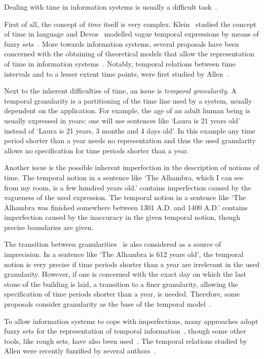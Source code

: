 Dealing with time in information systems is usually a difficult task~\cite{Bolour82}.

First of all, the concept of \emph{time} itself is very complex. Klein~\cite{klein94} studied the concept of time in language and Devos~\cite{devos94} modelled vague temporal expressions by means of fuzzy sets~\cite{zadeh65}. More towards information systems, several proposals have been concerned with the obtaining of theoretical models that allow the representation of time in information systems~\cite{devos98,Cru97}. Notably, temporal relations between time intervals and to a lesser extent time points, were first studied by Allen~\cite{Allen83}.

Next to the inherent difficulties of time, an issue is \emph{temporal granularity}. A temporal granularity is a partitioning of the time line used by a system, usually dependent on the application. For example, the age of an adult human being is usually expressed in years: one will use sentences like `Laura is 21 years old' instead of `Laura is 21 years, 3 months and 4 days old'. In this example any time period shorter than a year needs no representation and thus the used granularity allows no specification for time periods shorter than a year.

Another issue is the possible inherent imperfection in the description of notions of time. The temporal notion in a sentence like `The Alhambra, which I can see from my room, is a few hundred years old.' contains imperfection caused by the vagueness of the used expression. The temporal notion in a sentence like `The Alhambra was finished somewhere between 1301 A.D. and 1400 A.D.' contains imperfection caused by the inaccuracy in the given temporal notion, though precise boundaries are given.

The transition between granularities~\cite{Lin97} is also considered as a source of imprecision. In a sentence like `The Alhambra is 612 years old', the temporal notion is very precise if time periods shorter than a year are irrelevant in the used granularity. However, if one is concerned with the exact day on which the last stone of the building is laid, a transition to a finer granularity, allowing the specification of time periods shorter than a year, is needed. Therefore, some proposals consider granularity as the base of the temporal model~\cite{Cru97}.

To allow information systems to cope with imperfections, many approaches adopt fuzzy sets for the representation of temporal information~\cite{343607,nagypal03,Dubois:jucs_9_9:fuzziness_and_uncertainty_in}, though some other tools, like rough sets, have also been used~\cite{Qia09}. The temporal relations studied by Allen were recently fuzzified by several authors~\cite{ohlbach04,nagypal03,schockaert08}.



